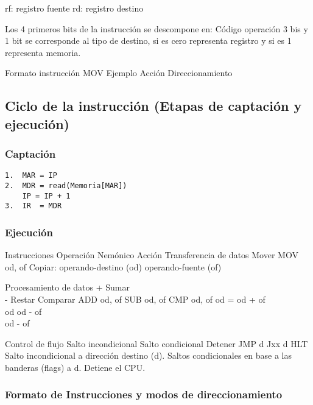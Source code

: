 \documentclass[12pt,twoside]{templates/unerthesis}
\begin{document}
rf: registro fuente
rd: registro destino

Los 4 primeros bits de la instrucción se descompone en:
Código operación 3 bis y 1 bit se corresponde al tipo de destino, si es cero representa registro y si es 1 representa memoria.

Formato instrucción MOV Ejemplo Acción Direccionamiento

\hypertarget{ciclo-de-la-instrucciuxf3n-etapas-de-captaciuxf3n-y-ejecuciuxf3n}{%
\subsection{Ciclo de la instrucción (Etapas de captación y ejecución)}\label{ciclo-de-la-instrucciuxf3n-etapas-de-captaciuxf3n-y-ejecuciuxf3n}}

\hypertarget{captaciuxf3n}{%
\subsubsection{Captación}\label{captaciuxf3n}}

\begin{verbatim}
1.  MAR = IP 
2.  MDR = read(Memoria[MAR])
    IP = IP + 1
3.  IR  = MDR
\end{verbatim}

\hypertarget{ejecuciuxf3n}{%
\subsubsection{Ejecución}\label{ejecuciuxf3n}}

Instrucciones Operación Nemónico Acción
Transferencia de datos Mover MOV od, of Copiar: operando-destino (od) operando-fuente (of)

Procesamiento de datos + Sumar\\
- Restar
Comparar ADD od, of
SUB od, of
CMP od, of od = od + of\\
od od - of\\
od - of

Control de flujo Salto incondicional
Salto condicional
Detener JMP d
Jxx d
HLT Salto incondicional a dirección destino (d).
Saltos condicionales en base a las banderas (flags) a d.
Detiene el CPU.

\hypertarget{formato-de-instrucciones-y-modos-de-direccionamiento}{%
\subsubsection{Formato de Instrucciones y modos de direccionamiento}\label{formato-de-instrucciones-y-modos-de-direccionamiento}}
\end{document}
